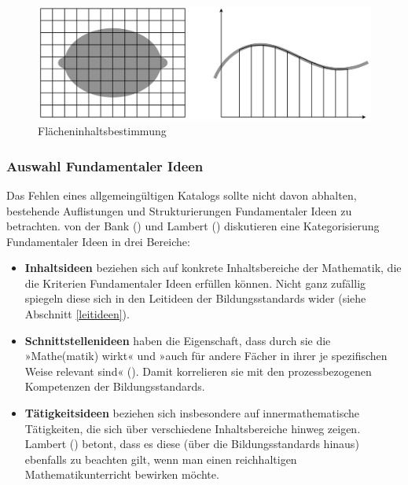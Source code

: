 \documentclass[
]{scrbook}
\theoremstyle{definition}
\theoremstyle{definition}
\theoremstyle{definition}
\theoremstyle{definition}
\theoremstyle{remark}
\begin{document}
\begin{figure}

{\centering \includegraphics[width=0.75\linewidth]{pictures/3-Flaeche} 

}

\caption{Flächeninhaltsbestimmung}\label{fig:Flaeche}
\end{figure}

\subsubsection{Auswahl Fundamentaler Ideen}\label{auswahl-fundamentaler-ideen}

Das Fehlen eines allgemeingültigen Katalogs sollte nicht davon abhalten, bestehende Auflistungen und Strukturierungen Fundamentaler Ideen zu betrachten. von der Bank () und Lambert () diskutieren eine Kategorisierung Fundamentaler Ideen in drei Bereiche:

\begin{itemize}
\item
  \textbf{Inhaltsideen} beziehen sich auf konkrete Inhaltsbereiche der Mathematik, die die Kriterien Fundamentaler Ideen erfüllen können. Nicht ganz zufällig spiegeln diese sich in den Leitideen der Bildungsstandards wider (siehe Abschnitt \ref{leitideen}).
\item
  \textbf{Schnittstellenideen} haben die Eigenschaft, dass durch sie die »Mathe(matik) wirkt« und »auch für andere Fächer in ihrer je spezifischen Weise relevant sind« (). Damit korrelieren sie mit den prozessbezogenen Kompetenzen der Bildungsstandards.
\item
  \textbf{Tätigkeitsideen} beziehen sich insbesondere auf innermathematische Tätigkeiten, die sich über verschiedene Inhaltsbereiche hinweg zeigen. Lambert () betont, dass es diese (über die Bildungsstandards hinaus) ebenfalls zu beachten gilt, wenn man einen reichhaltigen Mathematikunterricht bewirken möchte.
\end{itemize}
\end{document}
